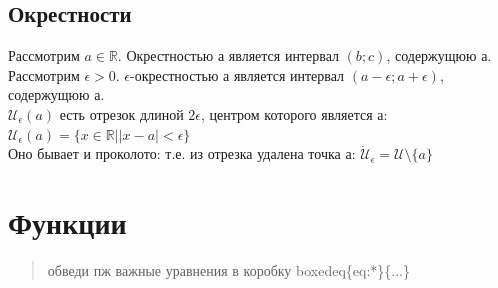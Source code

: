 \documentclass[oneside]{book}
\begin{document}
\begin{enumerate}
\section{Окрестности}

Рассмотрим $a \in \mathbb{R}$. Окрестностью а является интервал $(b; c)$, содержущюю а.
Рассмотрим $\epsilon > 0$. $\epsilon$-окрестностью а является интервал $(a-\epsilon; a+\epsilon)$, содержущюю а.\\
$\mathcal{U}_\epsilon(a)$ есть отрезок длиной  $2\epsilon$, центром которого является а: \\
$\mathcal{U}_\epsilon(a) = \{x \in \mathbb{R} | |x-a|< \epsilon\}$\\
Оно бывает и проколото: т.е. из отрезка удалена точка а: $\dot{\mathcal{U}}_\epsilon = \mathcal{U} \setminus \{a\}$

\chapter{Функции\\}
\begin{quote}
    обведи пж важные уравнения в коробку boxedeq\{eq:*\}\{...\}
\end{quote}


\end{enumerate}
\end{document}
